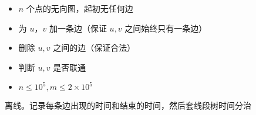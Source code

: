\documentclass[E:/GsjzTle/main/main.tex]{subfiles}
\begin{document}
\begin{itemize}
\item
  \(n\) 个点的无向图，起初无任何边
\item

    为 \(u，v\) 加一条边（保证 \(u,v\) 之间始终只有一条边）

\item

    删除 \(u,v\) 之间的边（保证合法）

\item

    判断 \(u,v\) 是否联通

\item
  \(n≤10^5, m≤2\times 10^5\)
\end{itemize}

离线。记录每条边出现的时间和结束的时间，然后套线段树时间分治
\end{document}
